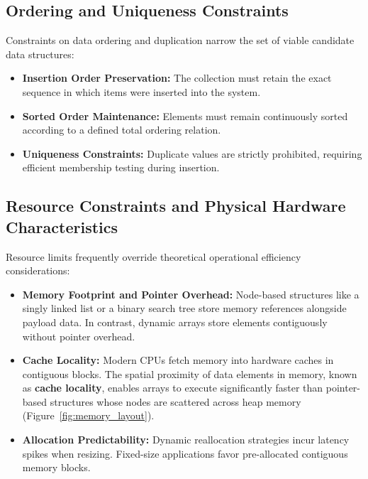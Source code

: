 \documentclass[12pt]{report}
\begin{document}
\subsection{Ordering and Uniqueness Constraints}
Constraints on data ordering and duplication narrow the set of viable candidate data structures:
\begin{itemize}
    \item \textbf{Insertion Order Preservation:} The collection must retain the exact sequence in which items were inserted into the system.
    \item \textbf{Sorted Order Maintenance:} Elements must remain continuously sorted according to a defined total ordering relation.
    \item \textbf{Uniqueness Constraints:} Duplicate values are strictly prohibited, requiring efficient membership testing during insertion.
\end{itemize}

\subsection{Resource Constraints and Physical Hardware Characteristics}
Resource limits frequently override theoretical operational efficiency considerations:
\begin{itemize}
    \item \textbf{Memory Footprint and Pointer Overhead:} Node-based structures like a singly linked list or a binary search tree store memory references alongside payload data. In contrast, dynamic arrays store elements contiguously without pointer overhead.
    \item \textbf{Cache Locality:} Modern CPUs fetch memory into hardware caches in contiguous blocks. The spatial proximity of data elements in memory, known as \textbf{cache locality}, enables arrays to execute significantly faster than pointer-based structures whose nodes are scattered across heap memory (Figure~\ref{fig:memory_layout}).
    \item \textbf{Allocation Predictability:} Dynamic reallocation strategies incur latency spikes when resizing. Fixed-size applications favor pre-allocated contiguous memory blocks.
\end{itemize}
\end{document}
